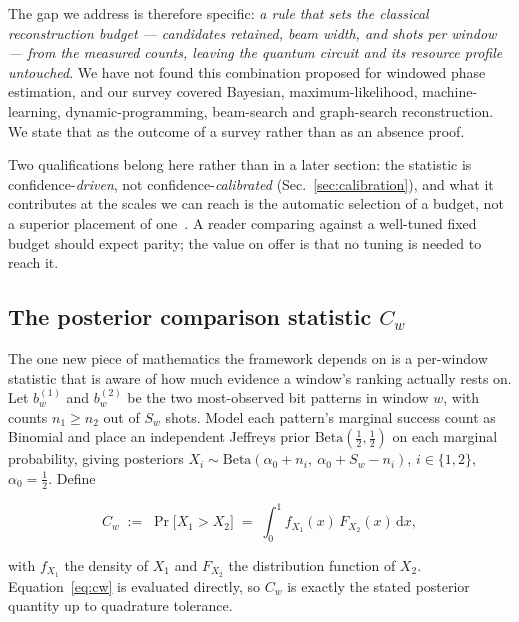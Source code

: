 \documentclass[final,5p,times,longtitle]{elsarticle}
\newcommand{\Cw}{C_w}
\begin{document}
The gap we address is therefore specific: \emph{a rule that sets the
classical reconstruction budget --- candidates retained, beam width, and
shots per window --- from the measured counts, leaving the quantum
circuit and its resource profile untouched}. We have not found this
combination proposed for windowed phase estimation, and our survey
covered Bayesian, maximum-likelihood, machine-learning,
dynamic-programming, beam-search and graph-search reconstruction. We
state that as the outcome of a survey rather than as an absence proof.

Two qualifications belong here rather than in a later section: the
statistic is confidence-\emph{driven}, not confidence-\emph{calibrated}
(Sec.~\ref{sec:calibration}), and what it contributes at the scales we
can reach is the automatic selection of a budget, not a superior
placement of one~\cite{companion}. A reader comparing against a
well-tuned fixed budget should expect parity; the value on offer is that
no tuning is needed to reach it.

\subsection{The posterior comparison statistic $\Cw$}
\label{sec:cw}

The one new piece of mathematics the framework depends on is a per-window
statistic that is aware of how much evidence a window's ranking actually
rests on. Let $b^{(1)}_w$ and $b^{(2)}_w$ be the two most-observed bit
patterns in window $w$, with counts $n_1 \ge n_2$ out of $S_w$ shots.
Model each pattern's marginal success count as Binomial and place an
independent Jeffreys prior $\mathrm{Beta}(\tfrac12,\tfrac12)$
\cite{jeffreys1946} on each marginal probability, giving posteriors
$X_i\sim\mathrm{Beta}(\alpha_0+n_i,\ \alpha_0+S_w-n_i)$, $i\in\{1,2\}$,
$\alpha_0=\tfrac12$. Define

\begin{equation}
\Cw \;\mathrel{:=}\; \Pr\!\big[X_1 > X_2\big]
\;=\; \int_0^1 f_{X_1}(x)\,F_{X_2}(x)\,\mathrm{d}x ,
\label{eq:cw}
\end{equation}

with $f_{X_1}$ the density of $X_1$ and $F_{X_2}$ the distribution
function of $X_2$. Equation~\eqref{eq:cw} is evaluated directly, so
$\Cw$ is exactly the stated posterior quantity up to quadrature
tolerance.
\end{document}
